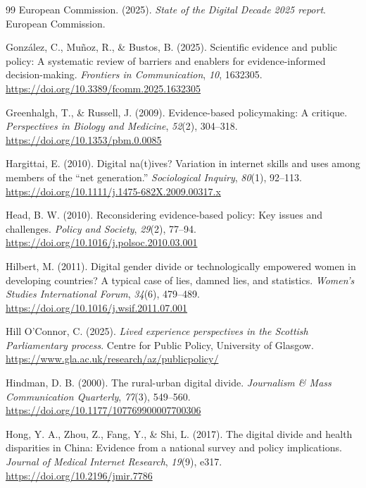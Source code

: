 \begin{thebibliography}{99}
European Commission. (2025). \textit{State of the Digital Decade 2025 report}. European Commission.

González, C., Muñoz, R., \& Bustos, B. (2025). Scientific evidence and public policy: A systematic review of barriers and enablers for evidence-informed decision-making. \textit{Frontiers in Communication}, \textit{10}, 1632305. \url{https://doi.org/10.3389/fcomm.2025.1632305}

Greenhalgh, T., \& Russell, J. (2009). Evidence-based policymaking: A critique. \textit{Perspectives in Biology and Medicine}, \textit{52}(2), 304--318. \url{https://doi.org/10.1353/pbm.0.0085}

Hargittai, E. (2010). Digital na(t)ives? Variation in internet skills and uses among members of the ``net generation.'' \textit{Sociological Inquiry}, \textit{80}(1), 92--113. \url{https://doi.org/10.1111/j.1475-682X.2009.00317.x}

Head, B. W. (2010). Reconsidering evidence-based policy: Key issues and challenges. \textit{Policy and Society}, \textit{29}(2), 77--94. \url{https://doi.org/10.1016/j.polsoc.2010.03.001}

Hilbert, M. (2011). Digital gender divide or technologically empowered women in developing countries? A typical case of lies, damned lies, and statistics. \textit{Women's Studies International Forum}, \textit{34}(6), 479--489. \url{https://doi.org/10.1016/j.wsif.2011.07.001}

Hill O'Connor, C. (2025). \textit{Lived experience perspectives in the Scottish Parliamentary process}. Centre for Public Policy, University of Glasgow. \url{https://www.gla.ac.uk/research/az/publicpolicy/}

Hindman, D. B. (2000). The rural-urban digital divide. \textit{Journalism \& Mass Communication Quarterly}, \textit{77}(3), 549--560. \url{https://doi.org/10.1177/107769900007700306}

Hong, Y. A., Zhou, Z., Fang, Y., \& Shi, L. (2017). The digital divide and health disparities in China: Evidence from a national survey and policy implications. \textit{Journal of Medical Internet Research}, \textit{19}(9), e317. \url{https://doi.org/10.2196/jmir.7786}


\end{thebibliography}
